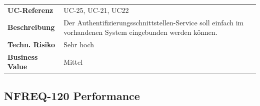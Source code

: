 \begin{longtable}[c]{@{}ll@{}}
\toprule
\begin{minipage}[t]{0.20\columnwidth}\raggedright\strut
\textbf{UC-Referenz}
\strut\end{minipage} &
\begin{minipage}[t]{0.74\columnwidth}\raggedright\strut
UC-25, UC-21, UC22
\strut\end{minipage}\tabularnewline
\begin{minipage}[t]{0.20\columnwidth}\raggedright\strut
\textbf{Beschreibung}
\strut\end{minipage} &
\begin{minipage}[t]{0.74\columnwidth}\raggedright\strut
Der Authentifizierungsschnittstellen-Service soll einfach im vorhandenen
System eingebunden werden können.
\strut\end{minipage}\tabularnewline
\begin{minipage}[t]{0.20\columnwidth}\raggedright\strut
\textbf{Techn. Risiko}
\strut\end{minipage} &
\begin{minipage}[t]{0.74\columnwidth}\raggedright\strut
Sehr hoch
\strut\end{minipage}\tabularnewline
\begin{minipage}[t]{0.20\columnwidth}\raggedright\strut
\textbf{Business Value}
\strut\end{minipage} &
\begin{minipage}[t]{0.74\columnwidth}\raggedright\strut
Mittel
\strut\end{minipage}\tabularnewline
\bottomrule
\end{longtable}

\subsection{NFREQ-120 Performance}\label{nfreq-120-performance}


